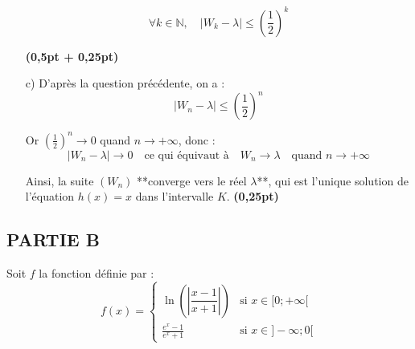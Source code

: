 \documentclass[12pt]{article}
\begin{document}
\begin{enumerate}
\[
\forall k \in \mathbb{N},\quad |W_k - \lambda| \leq \left( \frac{1}{2} \right)^k
\]

\hfill \textbf{(0,5pt + 0,25pt)}
\item[c)] D’après la question précédente, on a :
\[
|W_n - \lambda| \leq \left( \frac{1}{2} \right)^n
\]

Or \( \left( \frac{1}{2} \right)^n \to 0 \) quand \( n \to +\infty \), donc :
\[
|W_n - \lambda| \to 0
\quad \text{ce qui équivaut à} \quad
W_n \to \lambda
\quad \text{quand } n \to +\infty
\]

Ainsi, la suite \( (W_n) \) **converge vers le réel \( \lambda \)**, qui est l’unique solution de l’équation \( h(x) = x \) dans l’intervalle \( K \). \hfill \textbf{(0,25pt)}

\end{enumerate}

\subsection*{PARTIE B}

Soit \( f \) la fonction définie par :
\[
f(x) =
\begin{cases}
\ln\left( \left| \dfrac{x - 1}{x + 1} \right| \right) & \text{si } x \in [0 ; +\infty[ \\
\displaystyle \frac{e^x - 1}{e^x + 1} & \text{si } x \in ]-\infty ; 0[
\end{cases}
\]
\end{document}
